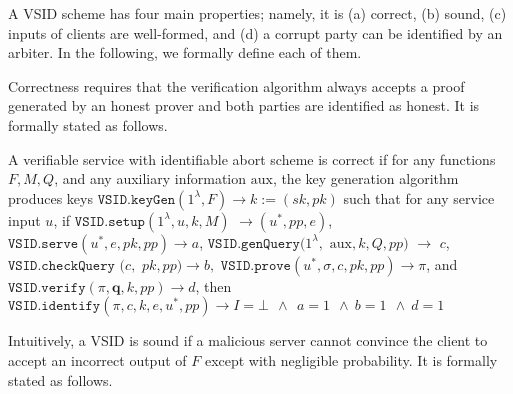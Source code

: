 A VSID scheme  has four main properties; namely, it is (a) correct, (b) sound, (c)  inputs of clients are well-formed, and (d) a corrupt party can be identified by an arbiter. In the following, we formally define each of them. 

Correctness requires that  the verification algorithm always accepts a proof generated by an honest prover and both parties are identified as honest.  It is formally stated as follows.

\begin{definition} A verifiable service with identifiable abort scheme  is  correct   if for any functions $F,M,Q$, and any auxiliary information $\text{aux}$, the key generation algorithm produces keys $\mathtt{VSID.keyGen}(1^{\lambda},F)\rightarrow k:=(sk,pk)$ such that for any service input $u$, if $\mathtt{VSID.setup}(1^{\lambda}, u,k,M)$ $\rightarrow (u^{\scriptscriptstyle *},{pp},e)$, $\mathtt{VSID.serve}(u^{\scriptscriptstyle *},e,pk,{pp})\rightarrow a$, $\mathtt{VSID.genQuery}(1^{\lambda}, $ $ \text{aux},k,Q,{pp})$ $ \rightarrow$ $ c$, $\mathtt{VSID.checkQuery}$ $(c, $ $pk,{pp})\rightarrow b,$  $\mathtt{VSID.prove}(u^{\scriptscriptstyle *},\sigma,c,pk,{pp})\rightarrow \pi$, and \\$\mathtt{VSID.verify}(\pi,\bm{q},k,{pp})\rightarrow d$, then  $\mathtt{VSID.identify}(\pi,c,k,e,u^{\scriptscriptstyle *},{pp})\rightarrow I=\bot \  \  \wedge \ \ a=1 \ \ \wedge \  b=1 \ \ \wedge \  d=1$
\end{definition}



Intuitively, a VSID is sound  if a malicious server cannot convince the client to accept an incorrect output of $F$ except with negligible probability. %
It is  formally stated as follows.

